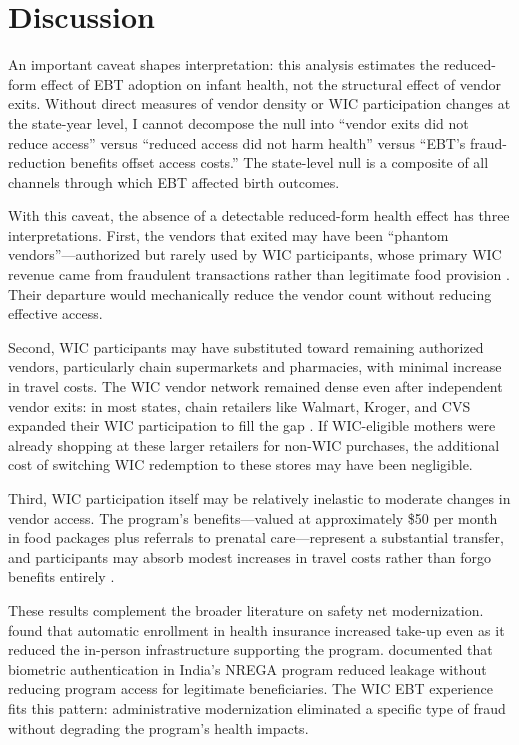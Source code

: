 \documentclass[12pt]{article}
\begin{document}
\section{Discussion}

An important caveat shapes interpretation: this analysis estimates the reduced-form effect of EBT adoption on infant health, not the structural effect of vendor exits. Without direct measures of vendor density or WIC participation changes at the state-year level, I cannot decompose the null into ``vendor exits did not reduce access'' versus ``reduced access did not harm health'' versus ``EBT's fraud-reduction benefits offset access costs.'' The state-level null is a composite of all channels through which EBT affected birth outcomes.

With this caveat, the absence of a detectable reduced-form health effect has three interpretations. First, the vendors that exited may have been ``phantom vendors''---authorized but rarely used by WIC participants, whose primary WIC revenue came from fraudulent transactions rather than legitimate food provision \citep{meckel2020}. Their departure would mechanically reduce the vendor count without reducing effective access.

Second, WIC participants may have substituted toward remaining authorized vendors, particularly chain supermarkets and pharmacies, with minimal increase in travel costs. The WIC vendor network remained dense even after independent vendor exits: in most states, chain retailers like Walmart, Kroger, and CVS expanded their WIC participation to fill the gap \citep{andreyeva2012}. If WIC-eligible mothers were already shopping at these larger retailers for non-WIC purchases, the additional cost of switching WIC redemption to these stores may have been negligible.

Third, WIC participation itself may be relatively inelastic to moderate changes in vendor access. The program's benefits---valued at approximately \$50 per month in food packages plus referrals to prenatal care---represent a substantial transfer, and participants may absorb modest increases in travel costs rather than forgo benefits entirely \citep{bitler2003}.

These results complement the broader literature on safety net modernization. \citet{finkelstein2019} found that automatic enrollment in health insurance increased take-up even as it reduced the in-person infrastructure supporting the program. \citet{muralidharan2016} documented that biometric authentication in India's NREGA program reduced leakage without reducing program access for legitimate beneficiaries. The WIC EBT experience fits this pattern: administrative modernization eliminated a specific type of fraud without degrading the program's health impacts.
\end{document}
